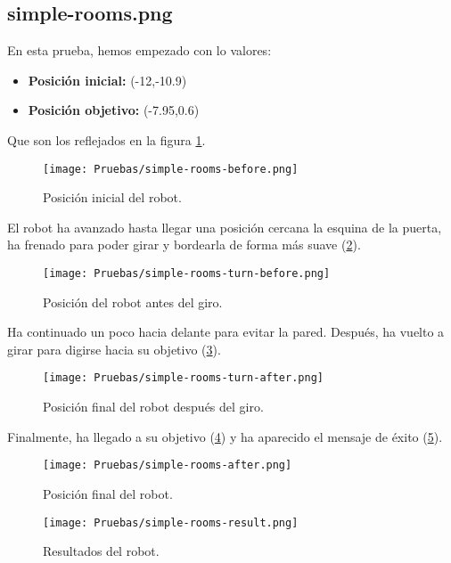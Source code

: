 \documentclass[a4paper, 11pt]{article}
\begin{document}
	\subsection{simple-rooms.png}
		En esta prueba, hemos empezado con lo valores:
		
		\begin{itemize}
			\item \textbf{Posición inicial:} (-12,-10.9)
			\item \textbf{Posición objetivo:} (-7.95,0.6)
		\end{itemize}
		
		Que son los reflejados en la figura \ref{begin-sr}.
		
		\begin{figure}[H]
			\centering
			\texttt{[image: Pruebas/simple-rooms-before.png]}
			\caption{Posición inicial del robot.}
			\label{begin-sr}	
		\end{figure}
		
		El robot ha avanzado hasta llegar una posición cercana la esquina de la puerta, ha frenado para
		poder girar y bordearla de forma más suave (\ref{turn-b-sr}).
		
		\begin{figure}[H]
			\centering
			\texttt{[image: Pruebas/simple-rooms-turn-before.png]}
			\caption{Posición del robot antes del giro.}
			\label{turn-b-sr}	
		\end{figure}
		
		Ha continuado un poco hacia delante para evitar la pared. Después, ha vuelto a girar para digirse
		hacia su objetivo (\ref{turn-a-sr}).
		
		\begin{figure}[H]
			\centering
			\texttt{[image: Pruebas/simple-rooms-turn-after.png]}
			\caption{Posición final del robot después del giro.}
			\label{turn-a-sr}	
		\end{figure}
		
		Finalmente, ha llegado a su objetivo (\ref{end-sr}) y ha aparecido el mensaje de éxito (\ref{res-sr}).

		\begin{figure}[H]
			\centering
			\texttt{[image: Pruebas/simple-rooms-after.png]}
			\caption{Posición final del robot.}
			\label{end-sr}	
		\end{figure}

		\begin{figure}[H]
			\centering
			\texttt{[image: Pruebas/simple-rooms-result.png]}
			\caption{Resultados del robot.}
			\label{res-sr}	
		\end{figure}
	
\end{document}
